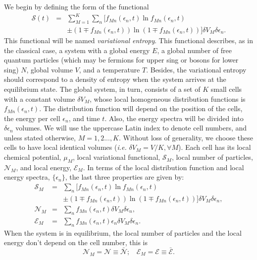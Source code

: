 \documentclass{article}
\newcommand{\Sm}{\Ss_M}
\newcommand{\de}{\delta}
\newcommand{\Ss}{\mathcal{S}}
\begin{document}
We begin by defining the form of the functional 
\begin{eqnarray}
    \Ss (t)&=&\sum_{M=1}^{K} \sum_{n} [ f_{Mn}(\epsilon_{n},t) \ln f_{Mn}(\epsilon_{n},t)\nonumber \\
    &&\pm (1 \mp f_{Mn}(\epsilon_{n},t)) \ln (1 \mp f_{Mn}(\epsilon_{n},t)) ]   \delta V_M \delta \epsilon_n \label{entropy}.
\end{eqnarray}
This functional will be named \textit{variational entropy}.
This functional describes, as in the classical case, a system with a global energy $E$, a global number of free
quantum particles (which may be fermions for upper sing or bosons for lower sing) $N$, global volume $V$, and a temperature $T$. 
Besides, the variational entropy should correspond to a density of entropy when the system arrives at the equilibrium state. The
global system, in turn, consists of a set of $K$ small cells with a constant volume $\delta V_M$, whose local homogeneous distribution functions is $f_{Mn}(\epsilon_{n},t)$. The distribution function will depend on the position of the cells, the energy per cell $\epsilon_{n}$, and time $t$. Also, the energy spectra will be divided into $\delta \epsilon_n$ volumes. We will use the uppercase Latin index to denote cell numbers, and unless stated otherwise, $M = 1, 2 . . . , K$. Without loss of generality, we choose these cells to have
local identical volumes (\textit{i.e.} $\delta V_M = V/K, \forall M$). Each cell has its local chemical potential, $\mu_M$, local
variational functional, $\Sm$, local number of particles, $\mathcal{N}_M$, and local energy, $\mathcal{E}_M$. In terms of the local distribution 
function and local energy spectra, $\{\epsilon_{n}\}$, the last three properties are given by:
\begin{eqnarray}
    \Sm &=&  \sum_{n} [ f_{Mn}(\epsilon_{n},t) \ln f_{Mn}(\epsilon_{n},t)\nonumber \\
    &&\pm (1 \mp f_{Mn}(\epsilon_{n},t)) \ln (1 \mp f_{Mn}(\epsilon_{n},t)) ] \de V_M \delta \epsilon_n \label{entropycell},\\
    {\mathcal{N}}_M&=& \sum_{n}f_{Mn}(\epsilon_{n} ,t) \de V_M \delta \epsilon_n, \nonumber \\
{\mathcal{E}}_M&=& \sum_{n}f_{Mn}(\epsilon_{n},t)\epsilon_{n} \de V_M \delta \epsilon_n.
\end{eqnarray}
When the system is in equilibrium, the local number of particles and the local energy don't depend on the cell number, this is
\begin{equation}
   {\mathcal{N}}_M=\mathcal{N}\equiv \bar{\mathcal{N}}; \ \ \ \  {\mathcal{E}}_M=\mathcal{E}\equiv \bar{\mathcal{E}}.
\end{equation}
\end{document}
